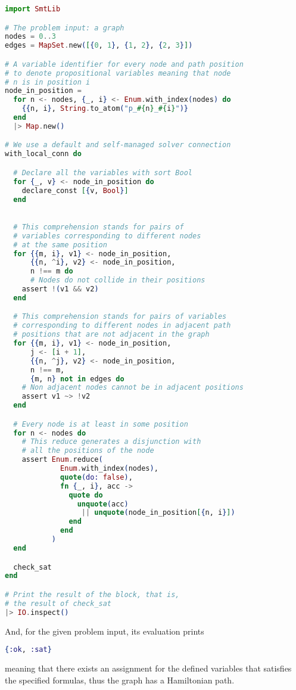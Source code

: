 \begin{lstlisting}[language=elixir,numbers=none,frame=none]
import SmtLib

# The problem input: a graph
nodes = 0..3
edges = MapSet.new([{0, 1}, {1, 2}, {2, 3}])

# A variable identifier for every node and path position
# to denote propositional variables meaning that node 
# n is in position i
node_in_position =
  for n <- nodes, {_, i} <- Enum.with_index(nodes) do
    {{n, i}, String.to_atom("p_#{n}_#{i}")}
  end
  |> Map.new()

# We use a default and self-managed solver connection
with_local_conn do

  # Declare all the variables with sort Bool
  for {_, v} <- node_in_position do
    declare_const [{v, Bool}]
  end

  
  # This comprehension stands for pairs of 
  # variables corresponding to different nodes 
  # at the same position
  for {{m, i}, v1} <- node_in_position, 
      {{n, ^i}, v2} <- node_in_position, 
      n !== m do
      # Nodes do not collide in their positions
    assert !(v1 && v2)
  end

  # This comprehension stands for pairs of variables 
  # corresponding to different nodes in adjacent path 
  # positions that are not adjacent in the graph
  for {{m, i}, v1} <- node_in_position,
      j <- [i + 1],
      {{n, ^j}, v2} <- node_in_position,
      n !== m,
      {m, n} not in edges do
    # Non adjacent nodes cannot be in adjacent positions 
    assert v1 ~> !v2
  end

  # Every node is at least in some position
  for n <- nodes do
    # This reduce generates a disjunction with 
    # all the positions of the node
    assert Enum.reduce(
             Enum.with_index(nodes),
             quote(do: false),
             fn {_, i}, acc ->
               quote do
                 unquote(acc) 
                  || unquote(node_in_position[{n, i}])
               end
             end
           )
  end

  check_sat
end

# Print the result of the block, that is,
# the result of check_sat
|> IO.inspect()
\end{lstlisting}

And, for the given problem input, its evaluation prints 

\begin{lstlisting}[language=elixir,numbers=none,frame=none]
{:ok, :sat}
\end{lstlisting}

meaning that there exists an assignment for the defined variables that satisfies
the specified formulas, thus the graph has a Hamiltonian path.
